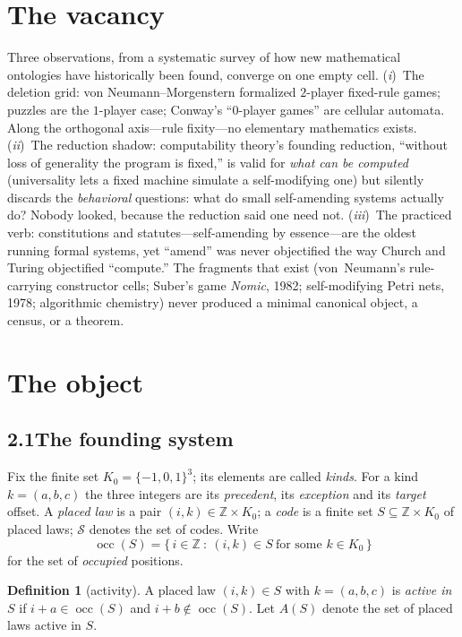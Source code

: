 \documentclass[10pt]{article}
\theoremstyle{definition}
\newtheorem{definition}[theorem]{Definition}
\theoremstyle{remark}
\begin{document}
\section{The vacancy}
Three observations, from a systematic survey of how new mathematical ontologies
have historically been found, converge on one empty cell.
(\emph{i})~The deletion grid: von Neumann--Morgenstern formalized $2$-player
fixed-rule games; puzzles are the $1$-player case; Conway's
``$0$-player games'' are cellular automata. Along the orthogonal axis---rule
fixity---no elementary mathematics exists.
(\emph{ii})~The reduction shadow: computability theory's founding reduction,
``without loss of generality the program is fixed,'' is valid for
\emph{what can be computed} (universality lets a fixed machine simulate a
self-modifying one) but silently discards the \emph{behavioral} questions: what
do small self-amending systems actually do? Nobody looked, because the
reduction said one need not.
(\emph{iii})~The practiced verb: constitutions and statutes---self-amending by
essence---are the oldest running formal systems, yet ``amend'' was never
objectified the way Church and Turing objectified ``compute.'' The fragments
that exist (von~Neumann's rule-carrying constructor cells; Suber's game
\emph{Nomic}, 1982; self-modifying Petri nets, 1978; algorithmic chemistry)
never produced a minimal canonical object, a census, or a theorem.

\section{The object}

\subsection*{2.1\quad The founding system}
Fix the finite set $K_0=\{-1,0,1\}^3$; its elements are called \emph{kinds}.
For a kind $k=(a,b,c)$ the three integers are its \emph{precedent}, its
\emph{exception} and its \emph{target} offset. A \emph{placed law} is a pair
$(i,k)\in\mathbb{Z}\times K_0$; a \emph{code} is a finite set
$S\subseteq\mathbb{Z}\times K_0$ of placed laws; $\mathcal{S}$ denotes the set
of codes. Write
\[
  \operatorname{occ}(S)=\{\,i\in\mathbb{Z}\ :\ (i,k)\in S\ \text{for some }k\in K_0\,\}
\]
for the set of \emph{occupied} positions.

\begin{definition}[activity]
A placed law $(i,k)\in S$ with $k=(a,b,c)$ is \emph{active in} $S$ if
$i+a\in\operatorname{occ}(S)$ and $i+b\notin\operatorname{occ}(S)$. Let $A(S)$
denote the set of placed laws active in $S$.
\end{definition}
\end{document}
